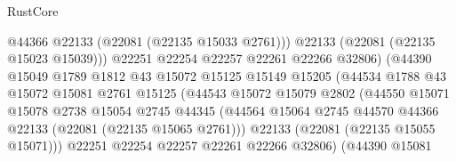 \begin{lexlean}{RustCore}
\begin{coremodule}
                                        @44366
                                        @22133
                                        (@22081 (@22135 @15033 @2761)))
                                      @22133
                                      (@22081 (@22135 @15023 @15039)))
                                    @22251
                                    @22254
                                    @22257
                                    @22261
                                    @22266
                                    @32806)
                                  (@44390
                                    @15049
                                    @1789
                                    @1812
                                    @43
                                    @15072
                                    @15125
                                    @15149
                                    @15205
                                    (@44534
                                      @1788
                                      @43
                                      @15072
                                      @15081
                                      @2761
                                      @15125
                                      (@44543
                                        @15072
                                        @15079
                                        @2802
                                        (@44550
                                          @15071
                                          @15078
                                          @2738
                                          @15054
                                          @2745
                                          @44345
                                          (@44564
                                            @15064
                                            @2745
                                            @44570
                                            @44366
                                            @22133
                                            (@22081 (@22135 @15065 @2761)))
                                          @22133
                                          (@22081 (@22135 @15055 @15071)))
                                        @22251
                                        @22254
                                        @22257
                                        @22261
                                        @22266
                                        @32806)
                                      (@44390
                                        @15081

\end{coremodule}
\end{lexlean}
